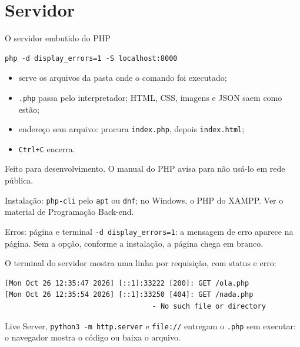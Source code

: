 \documentclass{beamer}
\begin{document}
\section{Servidor}

\begin{frame}[fragile]{O servidor embutido do PHP}
	\begin{verbatim}
php -d display_errors=1 -S localhost:8000
	\end{verbatim}

	\begin{itemize}
		\item serve os arquivos da pasta onde o comando foi executado;
		\item \texttt{.php} passa pelo interpretador; HTML, CSS, imagens e JSON
		      saem como estão;
		\item endereço sem arquivo: procura \texttt{index.php}, depois
		      \texttt{index.html};
		\item \texttt{Ctrl+C} encerra.
	\end{itemize}

	\vspace{0.2cm}
	Feito para desenvolvimento. O manual do PHP avisa para não usá-lo em rede
	pública.

	\vspace{0.2cm}
	Instalação: \texttt{php-cli} pelo \texttt{apt} ou \texttt{dnf}; no Windows,
	o PHP do XAMPP. Ver o material de Programação Back-end.
\end{frame}

\begin{frame}[fragile]{Erros: página e terminal}
	\texttt{-d display\_errors=1}: a mensagem de erro aparece na página. Sem a
	opção, conforme a instalação, a página chega em branco.

	\vspace{0.2cm}
	O terminal do servidor mostra uma linha por requisição, com status e erro:

	\begin{verbatim}
[Mon Oct 26 12:35:47 2026] [::1]:33222 [200]: GET /ola.php
[Mon Oct 26 12:35:54 2026] [::1]:33250 [404]: GET /nada.php
                                   - No such file or directory
	\end{verbatim}

	\vspace{0.2cm}
	Live Server, \texttt{python3 -m http.server} e \texttt{file://} entregam o
	\texttt{.php} sem executar: o navegador mostra o código ou baixa o arquivo.
\end{frame}
\end{document}
